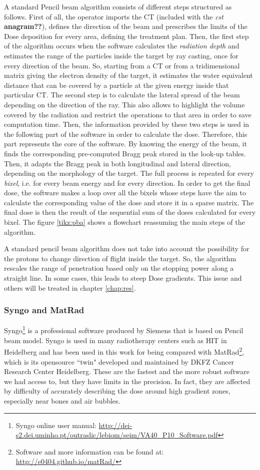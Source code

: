 \documentclass[12pt, a4paper, twoside]{book}
\begin{document}
A standard Pencil beam algorithm consists of different steps structured as follows. First of all, the operator imports the CT (included with the \emph{cst} \textbf{anagram??}), defines the direction of the beam and prescribes the limits of the Dose deposition for every area, defining the treatment plan.
Then, the first step of the algorithm occurs when the software calculates the \emph{radiation depth} and estimates the range of the particles inside the target by ray casting, once for every direction of the beam. So, starting from a CT or from a tridimensional matrix giving the electron density of the target, it estimates the water equivalent distance that can be covered by a particle at the given energy inside that particular CT. 
The second step is to calculate the lateral spread of the beam depending on the direction of the ray. This also allows to highlight the volume covered by the radiation and restrict the operations to that area in order to save computation time. 
Then, the information provided by these two steps is used in the following part of the software in order to calculate the dose. Therefore, this part represents the core of the software. By knowing the energy of the beam, it finds the corresponding pre-computed Bragg peak stored in the look-up tables. Then, it adapts the Bragg peak in both longitudinal and lateral direction, depending on the morphology of the target. 
The full process is repeated for every \emph{bixel}, i.e. for every beam energy and for every direction. In order to get the final dose, the software makes a loop over all the bixels whose steps have the aim to calculate the corresponding value of the dose and store it in a sparse matrix. The final dose is then the result of the sequential sum of the doses calculated for every bixel.
The figure \ref{tikz:pba} shows a flowchart reassuming the main steps of the algorithm.

A standard pencil beam algorithm does not take into account the possibility for the protons to change direction of flight inside the target. So, the algorithm rescales the range of penetration based only on the stopping power along a straight line. In some cases, this leads to steep Dose gradients. This issue and others will be treated in chapter \ref{chap:res}.


\subsubsection{Syngo and MatRad}
Syngo\footnote{Syngo online user manual: \url{http://dei-s2.dei.uminho.pt/outraslic/lebiom/seim/VA40_P10_Software.pdf}} is a professional software produced by Siemens that is based on Pencil beam model. Syngo is used in many radiotherapy centers such as HIT in Heidelberg and has been used in this work for being compared with MatRad\footnote{Software and more information can be found at: \url{http://e0404.github.io/matRad/}}, which is its opensource ``twin" developed and maintained by DKFZ Cancer Research Center Heidelberg. 
These are the fastest and the more robust software we had access to, but they have limits in the precision. In fact, they are affected by difficulty of accurately describing the dose around high gradient zones, especially near bones and air bubbles.
\end{document}
